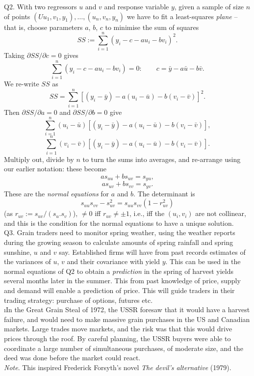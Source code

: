 \documentclass{article}
\begin{document}
\ni Q2. With two regressors $u$ and $v$ and response variable $y$, given a sample of size $n$ of
points $(Uu_1,v_1,y_1), \ldots, (u_n,v_n,y_n)$ we have to fit a least-squares {\it plane} -- that is, choose parameters
$a$, $b$, $c$ to minimise the sum of squares
$$
SS := {\sum}_{i=1}^n (y_i - c - a u_i - b v_i)^2.
$$
Taking $\partial SS/\partial c = 0$ gives
$$
{\sum}_{i=1}^n (y_i - c - a u_i - b v_i) = 0: \qquad c = \bar y -
a \bar u - b \bar v.
$$
We re-write $SS$ as
$$
SS ={\sum}_{i=1}^n [(y_i - \bar y) - a (u_i - \bar u)- b (v_i -
\bar v)]^2.
$$
Then $\partial SS/\partial a = 0$ and $\partial SS/\partial b = 0$ give
$$
{\sum}_{i=1}^n (u_i - \bar u)[(y_i - \bar y) - a (u_i - \bar u)- b
(v_i - \bar v)],
$$
$$
{\sum}_{i=1}^n (v_i - \bar v)[(y_i - \bar y) - a (u_i - \bar u)- b
(v_i - \bar v)].
$$
Multiply out, divide by $n$ to turn the sums into averages, and re-arrange using our earlier notation: these become
$$
a s_{uu} + b s_{uv} = s_{yu},
$$
$$
a s_{uv} + b s_{vv} = s_{yv}.
$$
These are the {\it normal equations} for $a$
and $b$. The determinant is
$$
s_{uu}s_{vv} - s_{uv}^2 = s_{uu}s_{vv}(1 - r_{uv}^2)
$$
(as $r_{uv} := s_{uv}/(s_u.s_v)$), $\neq 0$ iff
$r_{uv} \ne \pm1$, i.e., iff the $(u_i,v_i)$ are not collinear, and this is the condition for the
normal equations to have a unique solution. \\

\ni Q3.  Grain traders need to monitor spring weather, using the weather reports during the growing season to calculate amounts of spring rainfall and spring sunshine, $u$ and $v$ say.  Established firms will have from past records estimates of the variances of $u$, $v$ and their covariance with yield $y$.  This can be used in the normal equations of Q2 to obtain a {\it prediction} in the spring of harvest yields several months later in the summer.  This from past knowledge of price, supply and demand will enable a prediction of price.  This will guide traders in their trading strategy: purchase of options, futures etc. \\
\i In the Great Grain Steal of 1972, the USSR foresaw that it would have a harvest failure, and would need to make massive grain purchases in the US and Canadian markets.  Large trades move markets, and the risk was that this would drive prices through the roof.  By careful planning, the USSR buyers were able to coordinate a large number of simultaneous purchases, of moderate size, and the deed was done before the market could react. \\
{\it Note}.  This inspired Frederick Forsyth's novel {\sl The devil's alternative} (1979). \\
\end{document}
